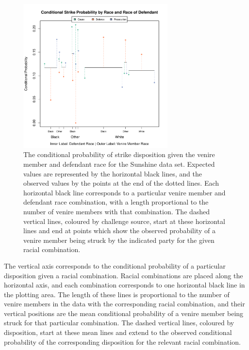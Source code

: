 \documentclass[12pt]{article}
\begin{document}
\begin{figure}[!h]
  \centering
  \includegraphics[width=0.7\textwidth]{RaceParCoord}
  \caption[A mobile plot of Sunshine strikes by racial combination]{\footnotesize The conditional probability of strike disposition given the
    venire member and defendant race for the Sunshine data set. Expected values are represented by the horizontal black lines, and the observed values
    by the points at the end of the dotted lines. Each horizontal black line corresponds to a particular venire member
    and defendant race combination, with a length proportional to the number of venire members with that combination. The dashed
    vertical lines, coloured by challenge source, start at these horizontal lines and end at points which show the observed
    probability of a venire member being struck by the indicated party for the given racial combination.}
  \label{fig:racedefmob}
\end{figure}

The vertical axis corresponds to the conditional probability of a particular disposition given a racial combination. Racial combinations are placed along the horizontal axis, and each combination corresponds to one horizontal black line in the plotting area. The length of these lines is proportional to the number of venire members in the data with the corresponding racial combination, and their vertical positions are the mean conditional probability of a venire member being struck for that particular combination. The dashed vertical lines, coloured by disposition, start at these mean lines and extend to the observed conditional probability of the corresponding disposition for the relevant racial combination. 
\end{document}
